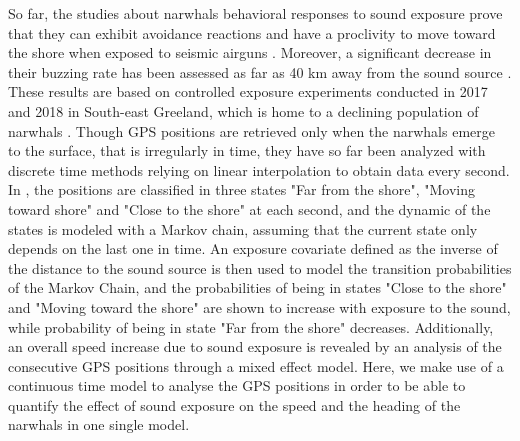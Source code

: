 \documentclass[11pt]{article}
\newcommand {\1}{\mathbb{1}}
\begin{document}
So far, the studies about narwhals behavioral responses to sound exposure prove that they can exhibit avoidance reactions and have a proclivity to move toward the shore when exposed to seismic airguns \cite{heide-jorgensen_behavioral_2021}. Moreover, a significant decrease in their buzzing rate has been assessed as far as 40 km away from the sound source \cite{tervo_narwhals_2021}. These results are based on controlled exposure experiments conducted in 2017 and 2018 in South-east Greeland, which is home to a declining population of narwhals \cite{garde_biological_2022}.  Though GPS positions are retrieved only when the narwhals emerge to the surface, that is irregularly in time, they have so far been analyzed with discrete time methods relying on linear interpolation to obtain data every second. In \cite{heide-jorgensen_behavioral_2021}, the positions are classified in three states "Far from the shore", "Moving toward shore" and "Close to the shore" at each second, and the dynamic of the states is modeled with a Markov chain, assuming that the current state only depends on the last one in time. An exposure covariate defined as the inverse of the distance to the sound source is then used to model the transition probabilities of the Markov Chain, and the probabilities of being in states "Close to the shore" and "Moving toward the shore" are shown to increase with exposure to the sound, while probability of being in state "Far from the shore" decreases. Additionally, an overall speed increase due to sound exposure is revealed by an analysis of the consecutive GPS positions through a mixed effect model. 
Here, we  make use of a continuous time model to analyse the GPS positions in order to be able to quantify the effect of sound exposure on the speed and the heading of the narwhals in one single model. \\
\end{document}
